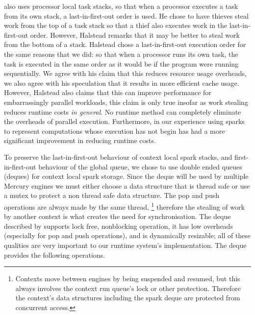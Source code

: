 \citet{halstead:1985:multilisp} also uses processor local task stacks,
so that when a processor executes a task from its own stack,
a last-in-first-out order is used.
He chose to have thieves steal work from the top of a task stack so
that a thief also executes work in the last-in-first-out order.
However, Halstead remarks that it may be better to steal work from the
bottom of a stack.
Halstead chose a last-in-first-out execution order for the same reasons
that we did:
so that when a processor runs its own task,
the task is executed in the same order as it would be if the program were
running sequentially.
We agree with his claim that this reduces resource usage overheads,
we also agree with his speculation that it results in more efficient cache
usage.
However,
Halstead also claims that this can improve performance for
embarrassingly parallel workloads,
this claim is only true insofar as work stealing reduces runtime costs
\emph{in general}.
No runtime method can completely eliminate the overheads of parallel
execution.
Furthermore,
in our experience using sparks to represent computations whose execution has
not begin has had a more significant improvement in reducing runtime costs.

To preserve the last-in-first-out behaviour of context local spark
stacks,
and first-in-first-out behaviour of the global queue,
we chose to use double ended queues (deques) for context local spark
storage.
Since the deque will be used by multiple Mercury engines we must either
choose a data structure that is thread safe or use a mutex to protect a non
thread safe data structure.
The pop and push operations are always made by the same thread,%
\footnote{
    Contexts move between engines by being suspended and resumed,
    but this always involves the context run queue's lock or other
    protection.
    Therefore the context's data structures including the
    spark deque are protected from concurrent access.}
therefore the stealing of work by another context is what creates the need
for synchronisation.
The deque described by \citet{Chase_2005_wsdeque} supports lock free,
nonblocking
operation, it has low overheads (especially for pop and push operations),
and is dynamically resizable;
all of these qualities are very important to our runtime system's
implementation.
The deque provides the following operations.

